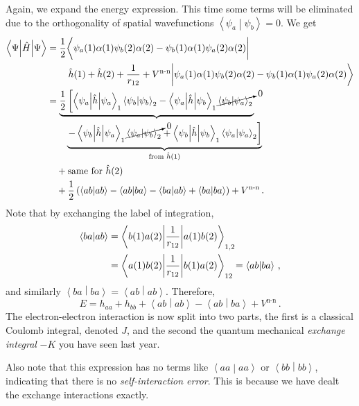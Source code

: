 \documentclass{article}
\theoremstyle{plain}\theoremheaderfont{\normalfont\itshape}\theorembodyfont{\rmfamily}\theoremseparator{.}\newtheorem*{rem}{Remark}\newtheorem*{ex}{Example}\newtheorem*{proof}{Proof}\newtheorem*{altp}{Alternative proof}
\theoremstyle{plain}\theoremheaderfont{\normalfont\bfseries}\theorembodyfont{\rmfamily}\theoremseparator{.}\newtheorem{thm}{Theorem}[section]\newtheorem{lem}[thm]{Lemma}\newtheorem{prop}[thm]{Proposition}\newtheorem*{cor}{Corollary}\newtheorem{defn}[thm]{Definition}\newtheorem{clm}[thm]{Claim}\newtheorem{clminproof}{Claim}\newtheorem{pos}{Postulate}[section]
\theoremstyle{break}\theoremheaderfont{\normalfont\itshape}\theorembodyfont{\rmfamily}\theoremseparator{.\medskip}\newtheorem*{proofskip}{Proof}\newtheorem*{exs}{Examples}\newtheorem*{rems}{Remarks}
\theoremstyle{break}\theoremheaderfont{\normalfont\bfseries}\theorembodyfont{\rmfamily}\theoremseparator{.\medskip}\newtheorem{lemskip}[thm]{Lemma}\newtheorem{defnskip}[thm]{Definition}\newtheorem{propskip}[thm]{Proposition}\newtheorem{thmskip}[thm]{Theorem}
\numberwithin{equation}{section}
\newcommand{\braket}[2]{\left\langle #1 \middle| #2 \right\rangle}
\newcommand{\expval}[2]{\left\langle #2 \middle| #1 \middle| #2 \right\rangle}
\newcommand{\mel}[3]{\left\langle #1 \middle| #2 \middle| #3 \right\rangle}
\begin{document}
    Again, we expand the energy expression. This time some terms will be eliminated due to the orthogonality of spatial wavefunctions \(\braket{\psi_a}{\psi_b}=0\). We get
    \begin{align}
        \expval{\hat{H}}{\Psi}&=\frac{1}{2}\bigg\langle\psi_a(1)\alpha(1)\psi_b(2)\alpha(2)-\psi_b(1)\alpha(1)\psi_a(2)\alpha(2)\bigg| \notag \\
        &\left. \qquad\hat{h}(1)+\hat{h}(2)+\frac{1}{r_{12}}+V^{\text{n-n}}\middle|\psi_a(1)\alpha(1)\psi_b(2)\alpha(2)-\psi_b(1)\alpha(1)\psi_a(2)\alpha(2)\right\rangle\notag\\
        &=\underbrace{\frac{1}{2}\left[\expval{\hat{h}}{\psi_a}_1\braket{\psi_b}{\psi_b}_2-\mel{\psi_a}{\hat{h}}{\psi_b}_1\cancelto{0}{\braket{\psi_b}{\psi_a}_2}\right.}\notag\\
        &\qquad \underbrace{\left. -\mel{\psi_b}{\hat{h}}{\psi_a}_1\cancelto{0}{\braket{\psi_a}{\psi_b}_2}+\expval{\hat{h}}{\psi_b}_1\braket{\psi_a}{\psi_a}_2\right]}_{\text{from }\hat{h}(1)}\notag\\
        &\quad +\text{same for }\hat{h}(2)\notag \\
        &\quad +\frac{1}{2}\left(\braket{ab}{ab}-\braket{ab}{ba}-\braket{ba}{ab}+\braket{ba}{ba}\right)+V^{\text{n-n}}\,.
    \end{align}
    Note that by exchanging the label of integration,
    \begin{align}
        \braket{ba}{ab}&=\mel{b(1)a(2)}{\frac{1}{r_{12}}}{a(1)b(2)}_{1,2}\notag\\
        &=\mel{a(1)b(2)}{\frac{1}{r_{12}}}{b(1)a(2)}_{12}=\braket{ab}{ba}\,,
    \end{align}
    and similarly \(\braket{ba}{ba}=\braket{ab}{ab}\). Therefore,
    \begin{equation}
        E=h_{aa}+h_{bb}+\braket{ab}{ab}-\braket{ab}{ba}+V^{\text{n-n}}\,.
    \end{equation}
    The electron-electron interaction is now split into two parts, the first is a classical Coulomb integral, denoted \(J\), and the second the quantum mechanical \textit{exchange integral} \(-K\) you have seen last year.

    Also note that this expression has no terms like \(\braket{aa}{aa}\) or \(\braket{bb}{bb}\), indicating that there is no \textit{self-interaction error}. This is because we have dealt the exchange interactions exactly.
\end{document}
